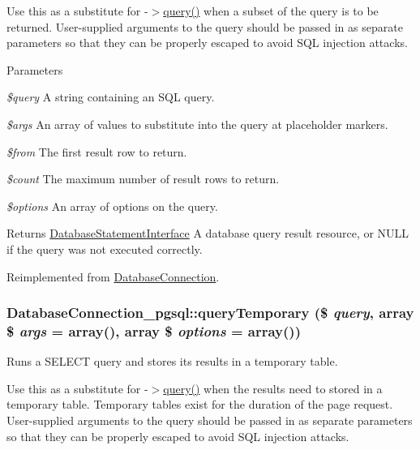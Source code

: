 Use this as a substitute for -\/$>$\hyperlink{classDatabaseConnection__pgsql_aa03d55a2837d71b3e832102447bc815f}{query()} when a subset of the query is to be returned. User-\/supplied arguments to the query should be passed in as separate parameters so that they can be properly escaped to avoid SQL injection attacks.


\begin{DoxyParams}{Parameters}
\item[{\em \$query}]A string containing an SQL query. \item[{\em \$args}]An array of values to substitute into the query at placeholder markers. \item[{\em \$from}]The first result row to return. \item[{\em \$count}]The maximum number of result rows to return. \item[{\em \$options}]An array of options on the query.\end{DoxyParams}
\begin{DoxyReturn}{Returns}
\hyperlink{interfaceDatabaseStatementInterface}{DatabaseStatementInterface} A database query result resource, or NULL if the query was not executed correctly. 
\end{DoxyReturn}


Reimplemented from \hyperlink{classDatabaseConnection_a1c97c77517b969270bb92c5c7e022a5d}{DatabaseConnection}.\hypertarget{classDatabaseConnection__pgsql_a4256f910e0d93f1fc28ea65aa1f1f145}{
\subsubsection[{queryTemporary}]{\setlength{\rightskip}{0pt plus 5cm}DatabaseConnection\_\-pgsql::queryTemporary (\$ {\em query}, \/  array \$ {\em args} = {\ttfamily array()}, \/  array \$ {\em options} = {\ttfamily array()})}}
\label{classDatabaseConnection__pgsql_a4256f910e0d93f1fc28ea65aa1f1f145}
Runs a SELECT query and stores its results in a temporary table.

Use this as a substitute for -\/$>$\hyperlink{classDatabaseConnection__pgsql_aa03d55a2837d71b3e832102447bc815f}{query()} when the results need to stored in a temporary table. Temporary tables exist for the duration of the page request. User-\/supplied arguments to the query should be passed in as separate parameters so that they can be properly escaped to avoid SQL injection attacks.

